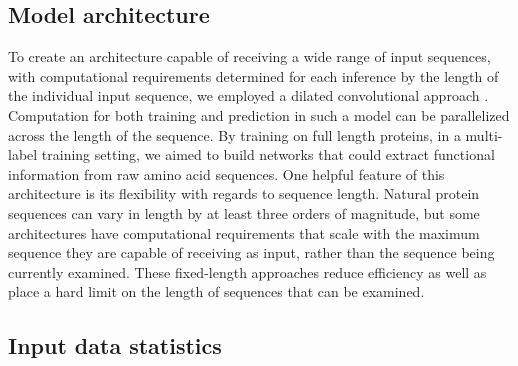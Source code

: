 \subsection*{Model architecture}
To create an architecture capable of receiving a wide range of input sequences, with computational requirements determined for each inference by the length of the individual input sequence, we employed a dilated convolutional approach \citep{dilatedconvolutions}. Computation for both training and prediction in such a model can be parallelized across the length of the sequence. By training on full length proteins, in a multi-label training setting, we aimed to build networks that could  extract functional information from raw amino acid sequences. One helpful feature of this architecture is its flexibility with regards to sequence length. Natural protein sequences can vary in length by at least three orders of magnitude, but some architectures have computational requirements that scale with the maximum sequence they are capable of receiving as input, rather than the sequence being currently examined. These fixed-length approaches reduce efficiency as well as place a hard limit on the length of sequences that can be examined. 

\subsection{Input data statistics}

